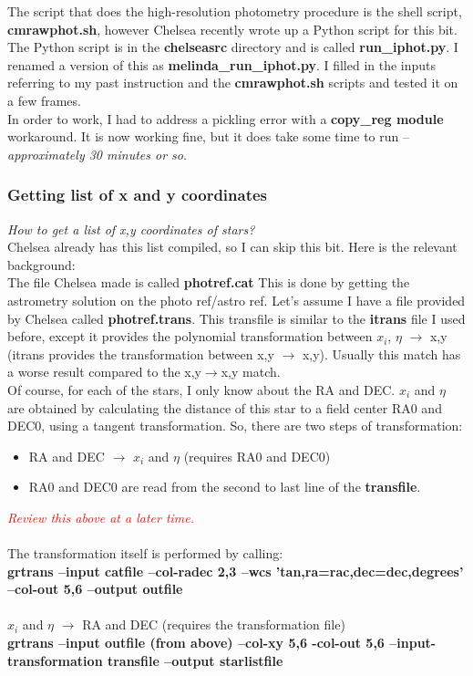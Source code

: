 The script that does the high-resolution photometry procedure is the shell script, \textbf{cmrawphot.sh}, however Chelsea recently wrote up a Python script for this bit.
The Python script is in the \textbf{chelseasrc} directory and is called \textbf{run\_iphot.py}. I renamed a version of this as \textbf{melinda\_run\_iphot.py}. I filled in the inputs referring to my past instruction and the \textbf{cmrawphot.sh} scripts and tested it on a few frames.\\ In order to work, I had to address a pickling error with a \textbf{copy\_reg module} workaround. It is now working fine, but it does take some time to run -- \textit{approximately 30 minutes or so}.

\subsubsection*{Getting list of x and y coordinates} 
\textit{How to get a list of x,y coordinates of stars?}\\
Chelsea already has this list compiled, so I can skip this bit. Here is the relevant background: \\
The file Chelsea made is called \textbf{photref.cat}
This is done by getting the astrometry solution on the photo ref/astro ref. 
Let's assume I have a file provided by Chelsea called \textbf{photref.trans}. 
This transfile is similar to the \textbf{itrans} file I used before, 
except it provides the polynomial transformation between 
$x_{i}$, $\eta$ $\rightarrow$ x,y (itrans provides the transformation between x,y $\rightarrow$ x,y). 
Usually this match has a worse result compared to the x,y$\rightarrow$x,y match.\\ 
Of course, for each of the stars, I only know about the RA and DEC.
$x_{i}$ and $\eta$ are obtained by calculating the distance of this star to a 
field center RA0 and DEC0, using a tangent transformation. 
So, there are two steps of transformation:
\begin{itemize}
\item RA and DEC $\rightarrow$  $x_{i}$ and $\eta$ (requires RA0 and DEC0) 
\item RA0 and DEC0 are read from the second to last line of the \textbf{transfile}.
\end{itemize}
\textcolor{red}{\textit{Review this above at a later time.}}\\ \\ 
The transformation itself is performed by calling: \\
\textbf{grtrans --input catfile --col-radec 2,3 --wcs 'tan,ra=rac,dec=dec,degrees' --col-out 5,6 --output outfile}\\ \\
$x_{i}$ and $\eta$ $\rightarrow$ RA and DEC (requires the transformation file)\\
\textbf{grtrans --input outfile (from above) --col-xy 5,6 -col-out 5,6 --input-transformation transfile --output starlistfile}

